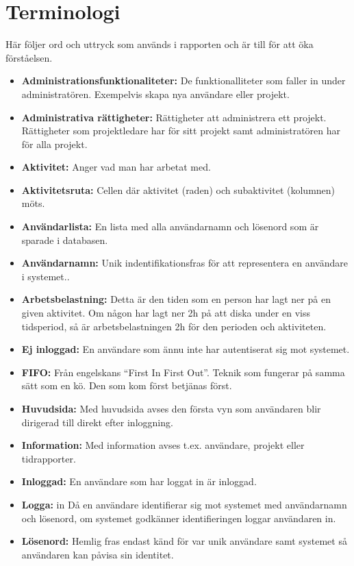 \documentclass[a4paper]{article}
\begin{document}
\section{Terminologi}
\label{terminologi}
Här följer ord och uttryck som används i rapporten och är till för att öka förståelsen.
\begin{itemize}
\item [] \textbf{Administrationsfunktionaliteter:} De funktionalliteter som faller in under administratören. Exempelvis skapa nya användare eller projekt.
\item [] \textbf{Administrativa rättigheter:} Rättigheter att administrera ett projekt. Rättigheter som projektledare har för sitt projekt samt administratören har för alla projekt.
\item [] \textbf{Aktivitet:} Anger vad man har arbetat med.
\item [] \textbf{Aktivitetsruta:} Cellen där aktivitet (raden) och subaktivitet (kolumnen) möts.
\item [] \textbf{Användarlista:} En lista med alla användarnamn och lösenord som är sparade i databasen.
\item [] \textbf{Användarnamn:} Unik indentifikationsfras för att representera en användare i systemet..
\item [] \textbf{Arbetsbelastning:} Detta är den tiden som en person har lagt ner på en given aktivitet. Om någon har lagt ner 2h på att diska under en viss tidsperiod, så är arbetsbelastningen 2h för den perioden och aktiviteten.
\item [] \textbf{Ej inloggad:} En användare som ännu inte har autentiserat sig mot systemet.
\item [] \textbf{FIFO:} Från engelskans ``First In First Out''. Teknik som fungerar på samma sätt som en kö. Den som kom först betjänas först.
\item [] \textbf{Huvudsida:} Med huvudsida avses den första vyn som användaren blir dirigerad till direkt efter inloggning. 
\item [] \textbf{Information:} Med information avses t.ex. användare, projekt eller tidrapporter.
\item [] \textbf{Inloggad:} En användare som har loggat in är inloggad.
\item [] \textbf{Logga:} in Då en användare identifierar sig mot systemet med användarnamn och lösenord, om systemet godkänner identifieringen loggar användaren in.
\item [] \textbf{Lösenord:} Hemlig fras endast känd för var unik användare samt systemet så användaren kan påvisa sin identitet.

\end{itemize}
\end{document}

